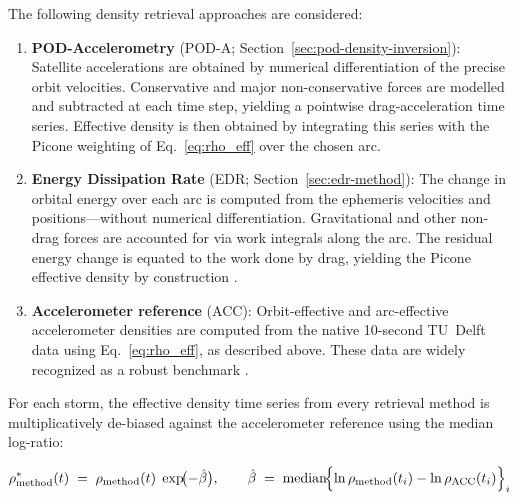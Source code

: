 \documentclass{agujournal2019}
\begin{document}
The following density retrieval approaches are considered:
\begin{enumerate}
  \item \textbf{POD-Accelerometry} (POD-A; Section~\ref{sec:pod-density-inversion}):
        Satellite accelerations are obtained by numerical differentiation of
        the precise orbit velocities. Conservative and major non-conservative
        forces are modelled and subtracted at each time step, yielding a
        pointwise drag-acceleration time series. Effective density is then
        obtained by integrating this series with the Picone weighting of
        Eq.~\eqref{eq:rho_eff} over the chosen arc.

  \item \textbf{Energy Dissipation Rate} (EDR; Section~\ref{sec:edr-method}):
        The change in orbital energy over each arc is computed from the
        ephemeris velocities and positions—without numerical differentiation.
        Gravitational and other non-drag forces are accounted for via work
        integrals along the arc. The residual energy change is equated to
        the work done by drag, yielding the Picone effective density by
        construction
        \cite{Sutton2021TowardSatellites, Fitzpatrick2024ApplyingSatellite}.

  \item \textbf{Accelerometer reference} (ACC):
        Orbit-effective and arc-effective accelerometer densities are computed
        from the native 10-second TU~Delft data
        \cite{Siemes2023NewGRACE-FO} using Eq.~\eqref{eq:rho_eff}, as
        described above. These data are widely recognized as a robust
        benchmark \cite{March2021, Mehta2017, Gondelach2020,
        Kuang2014MeasuringData, Emmert2015ThermosphericReview}.
\end{enumerate}

For each storm, the effective density time series from every retrieval method
is multiplicatively de-biased against the accelerometer reference using the
median log-ratio:
\begin{linenomath*}
\begin{equation}
\label{eq:debias}
\rho_{\text{method}}^{\ast}(t)
\;=\;
\rho_{\text{method}}(t)\;\exp\!\bigl(-\hat{\beta}\bigr),
\qquad
\hat{\beta}
\;=\;
\operatorname{median}\!\Bigl\{
  \ln\rho_{\text{method}}(t_{i}) - \ln\rho_{\text{ACC}}(t_{i})
\Bigr\}_{i}
\end{equation}
\end{linenomath*}
\end{document}

